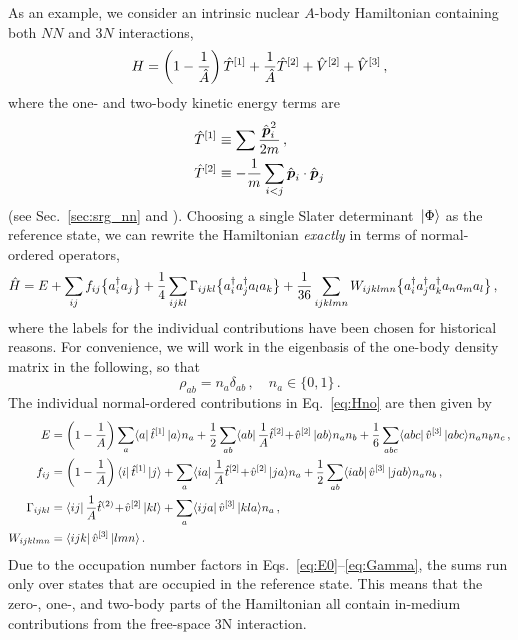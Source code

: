As an example, we consider an intrinsic nuclear $A$-body Hamiltonian 
containing both $NN$ and $3N$ interactions,
\begin{equation}\label{eq:def_Hint}
  H = \left(1-\frac{1}{\AO}\right)\TO^{[1]} + \frac{1}{\AO}\TO^{[2]} + \VO^{[2]} +\VO^{[3]}\,,
\end{equation}
where the one- and two-body kinetic energy terms are
\begin{align}
  \TO^{[1]} &\equiv \sum\frac{\pOV^2_i}{2m}\,,\\
  \TO^{[2]} &\equiv -\frac{1}{m}\sum_{i<j}\pOV_i\cdot\pOV_j
\end{align}
(see Sec.~\ref{sec:srg_nn} and \cite{Hergert:2009wh}). Choosing a 
single Slater determinant $\,|{\Phi}\rangle$ as the reference state, we can 
rewrite the Hamiltonian \emph{exactly} in terms of normal-ordered operators,
\begin{align}\label{eq:Hno}
  \HO &= E + \sum_{ij}f_{ij}\nord{\aaO_{i}\aO_{j}} + \frac{1}{4}\sum_{ijkl}\Gamma_{ijkl}\nord{\aaO_{i}\aaO_{j}\aO_{l}\aO_{k}}
    + \frac{1}{36}\sum_{ijklmn}W_{ijklmn}\nord{\aaO_{i}\aaO_{j}\aaO_{k}\aO_{n}\aO_{m}\aO_{l}}\,,
\end{align}
where the labels for the individual contributions have been chosen for 
historical reasons. For convenience, we will work in the eigenbasis of 
the one-body density matrix in the following, so that
\begin{equation}\label{eq:def_natorb}
  \rho_{ab}=n_{a}\delta_{ab}\,,\quad n_{a}\in\{0,1\}\,.
\end{equation}
The individual normal-ordered contributions in Eq.~\eqref{eq:Hno} are then 
given by
\begin{align}
  E &= \left(1-\frac{1}{A}\right)\sum_{a}\matrixe{a}{\tO^{[1]}}{a}n_{a}
      + \frac{1}{2}\sum_{ab}\matrixe{ab}{\frac{1}{A}\tO^{[2]}\!+\!\vO^{[2]}}{ab}n_{a}n_{b}
      + \frac{1}{6}\sum_{abc}\matrixe{abc}{\vO^{[3]}}{abc}n_{a}n_{b}n_{c}\,,\label{eq:E0}\\
%
  f_{ij} &= \left(1-\frac{1}{A}\right)\matrixe{i}{\tO^{[1]}}{j} 
      + \sum_{a}\matrixe{ia}{\frac{1}{A}\tO^{[2]}\!+\!\vO^{[2]}}{ja}n_{a}
      + \frac{1}{2}\sum_{ab}\matrixe{iab}{\vO^{[3]}}{jab}n_{a}n_{b}\,,\label{eq:f}   
      \\
% 
  \Gamma_{ijkl} &= \matrixe{ij}{\frac{1}{A}\tO^{(2)}\!+\!\vO^{[2]}}{kl} + \sum_{a}\matrixe{ija}{\vO^{[3]}}{kla}n_{a}\,,\label{eq:Gamma}\\
  W_{ijklmn}&=\matrixe{ijk}{\vO^{[3]}}{lmn}\,.
\end{align}
Due to the occupation number factors in Eqs.~\eqref{eq:E0}--\eqref{eq:Gamma}, the sums 
run only over states that are occupied in the reference state. This means that the 
zero-, one-, and two-body parts of the Hamiltonian all contain in-medium contributions 
from the free-space 3N interaction.

